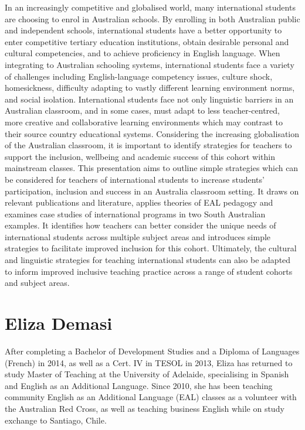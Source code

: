 \documentclass[twoside,14pt,a4paper,notitlepage]{memoir}
\begin{document}
In an increasingly competitive and globalised world, many international students are choosing to enrol in Australian schools. By enrolling in both Australian public and independent schools, international students have a better opportunity to enter competitive tertiary education institutions, obtain desirable personal and cultural competencies, and to achieve proficiency in English language. When integrating to Australian schooling systems, international students face a variety of challenges including English-language competency issues, culture shock, homesickness, difficulty adapting to vastly different learning environment norms, and social isolation. International students face not only linguistic barriers in an Australian classroom, and in some cases, must adapt to less teacher-centred, more creative and collaborative learning environments which may contrast to their source country educational systems. Considering the increasing globalisation of the Australian classroom, it is important to identify strategies for teachers to support the inclusion, wellbeing and academic success of this cohort within mainstream classes. This presentation aims to outline simple strategies which can be considered for teachers of international students to increase students’ participation, inclusion and success in an Australia classroom setting. It draws on relevant publications and literature, applies theories of EAL pedagogy and examines case studies of international programs in two South Australian examples. It identifies how teachers can better consider the unique needs of international students across multiple subject areas and introduces simple strategies to facilitate improved inclusion for this cohort. Ultimately, the cultural and linguistic strategies for teaching international students can also be adapted to inform improved inclusive teaching practice across a range of student cohorts and subject areas. 

\section*{Eliza Demasi}

After completing a Bachelor of Development Studies and a Diploma of Languages (French) in 2014, as well as a Cert. IV in TESOL in 2013, Eliza has returned to study Master of Teaching at the University of Adelaide, specialising in Spanish and English as an Additional Language. Since 2010, she has been teaching community English as an Additional Language (EAL) classes as a volunteer with the Australian Red Cross, as well as teaching business English while on study exchange to Santiago, Chile. 
\end{document}
